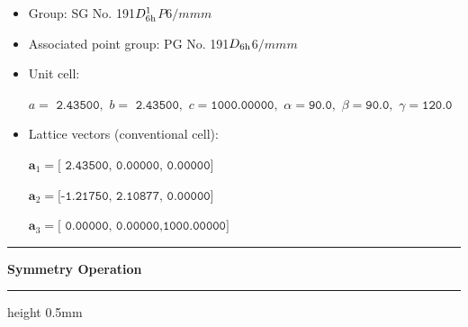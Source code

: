 \documentclass[fleqn,10pt,landscape]{jsarticle}
\begin{document}
\begin{itemize}
\item Group: SG No. 191\quad$D_{\rm 6h}^{1}$\quad$P6/mmm$\quad[ hexagonal ]
\item Associated point group: PG No. 191\quad$D_{\rm 6h}$\quad$6/mmm$\quad[ hexagonal ]
\end{itemize}
\begin{itemize}
\item Unit cell:

\quad $a=\texttt{ 2.43500},\,\, b=\texttt{ 2.43500},\,\, c=\texttt{1000.00000},\,\, \alpha=\texttt{90.0},\,\, \beta=\texttt{90.0},\,\, \gamma=\texttt{120.0}$

\item Lattice vectors (conventional cell):

\quad $\bm{a}_1=\texttt{[ 2.43500, 0.00000, 0.00000]}$

\quad $\bm{a}_2=\texttt{[-1.21750, 2.10877, 0.00000]}$

\quad $\bm{a}_3=\texttt{[ 0.00000, 0.00000,1000.00000]}$

\end{itemize}
\vspace{5mm}
\noindent \rule[0.5mm]{5mm}{0.5mm}\hspace{3mm}\textbf{Symmetry Operation}\hspace{3mm}\leaders\hrule height 0.5mm\hfill\kern0pt
\vspace{3mm}
\end{document}
